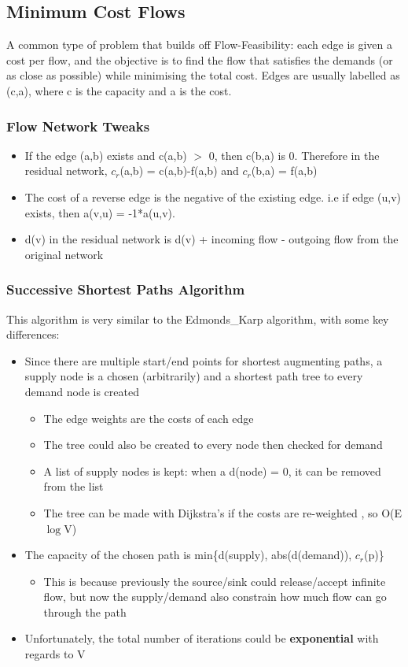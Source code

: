 \subsection{Minimum Cost Flows}
A common type of problem that builds off Flow-Feasibility: each edge is given a cost per flow, and the objective is to find the flow that satisfies the demands (or as close as possible) while minimising the total cost. Edges are usually labelled as (c,a), where c is the capacity and a is the cost. 

\subsubsection{Flow Network Tweaks}
\begin{itemize}
    \item If the edge (a,b) exists and c(a,b) $>$ 0, then c(b,a) is 0. Therefore in the residual network, $c_r$(a,b) = c(a,b)-f(a,b) and $c_r$(b,a) = f(a,b)
    \item The cost of a reverse edge is the negative of the existing edge. i.e if edge (u,v) exists, then a(v,u) = -1*a(u,v). 
    \item d(v) in the residual network is d(v) + incoming flow - outgoing flow from the original network
\end{itemize}

\subsubsection{Successive Shortest Paths Algorithm}
This algorithm is very similar to the Edmonds\_Karp algorithm, with some key differences:
\begin{itemize}
    \item Since there are multiple start/end points for shortest augmenting paths, a supply node is a chosen (arbitrarily) and a shortest path tree to every demand node is created
    \begin{itemize}
        \item The edge weights are the costs of each edge
        \item The tree could also be created to every node then checked for demand
        \item A list of supply nodes is kept: when a d(node) = 0, it can be removed from the list
        \item The tree can be made with Dijkstra's if the costs are re-weighted , so O(E $\log$V)
    \end{itemize}
    \item The capacity of the chosen path is min\{d(supply), abs(d(demand)), $c_r$(p)\}
    \begin{itemize}
        \item This is because previously the source/sink could release/accept infinite flow, but now the supply/demand also constrain how much flow can go through the path
    \end{itemize}
    \item Unfortunately, the total number of iterations could be \textbf{exponential} with regards to V
\end{itemize}

